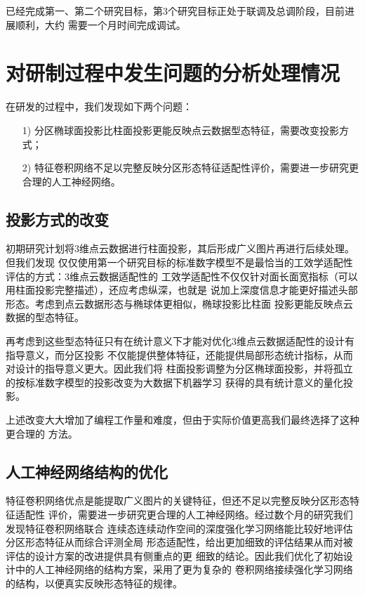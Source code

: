 \documentclass[a4paper,12pt]{ctexbook}	%
\begin{document}
已经完成第一、第二个研究目标，第3个研究目标正处于联调及总调阶段，目前进展顺利，大约
需要一个月时间完成调试。


\section{对研制过程中发生问题的分析处理情况}

在研发的过程中，我们发现如下两个问题：

\begin{itemize}
\setlength{\parskip}{0pt}
\item[1)]
分区椭球面投影比柱面投影更能反映点云数据型态特征，需要改变投影方式；

\item[2)]
特征卷积网络不足以完整反映分区形态特征适配性评价，需要进一步研究更合理的人工神经网络。

\end{itemize}


\subsection{投影方式的改变}

初期研究计划将3维点云数据进行柱面投影，其后形成广义图片再进行后续处理。但我们发现
仅仅使用第一个研究目标的标准数字模型不是最恰当的工效学适配性评估的方式：3维点云数据适配性的
工效学适配性不仅仅针对面长面宽指标（可以用柱面投影完整描述），还应考虑纵深，也就是
说加上深度信息才能更好描述头部形态。考虑到点云数据形态与椭球体更相似，椭球投影比柱面
投影更能反映点云数据的型态特征。

再考虑到这些型态特征只有在统计意义下才能对优化3维点云数据适配性的设计有指导意义，而分区投影
不仅能提供整体特征，还能提供局部形态统计指标，从而对设计的指导意义更大。因此我们将
柱面投影调整为分区椭球面投影，并将孤立的按标准数字模型的投影改变为大数据下机器学习
获得的具有统计意义的量化投影。

上述改变大大增加了编程工作量和难度，但由于实际价值更高我们最终选择了这种更合理的
方法。

\subsection{人工神经网络结构的优化}

特征卷积网络优点是能提取广义图片的关键特征，但还不足以完整反映分区形态特征适配性
评价，需要进一步研究更合理的人工神经网络。经过数个月的研究我们发现特征卷积网络联合
连续态连续动作空间的深度强化学习网络能比较好地评估分区形态特征从而综合评测全局
形态适配性，给出更加细致的评估结果从而对被评估的设计方案的改进提供具有侧重点的更
细致的结论。因此我们优化了初始设计中的人工神经网络的结构方案，采用了更为复杂的
卷积网络接续强化学习网络的结构，以便真实反映形态特征的规律。
\end{document}

